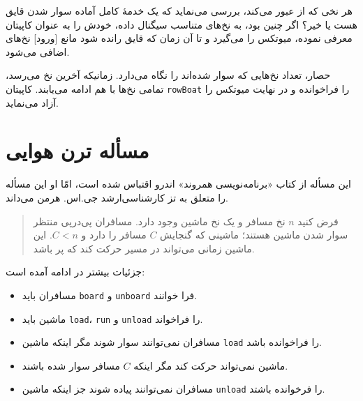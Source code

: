 \documentclass{book}
\newcommand{\clearemptydoublepage}{\newpage\cleardoublepage}
\begin{document}
    هر نخی که از  عبور می‌کند،‌ 
    بررسی می‌نماید که یک خدمهٔ کامل آماده سوار شدن قایق هست یا خیر؟ اگر چنین بود، به نخ‌های متناسب سیگنال داده، خودش را به عنوان کاپیتان 
    معرفی نموده، میوتکس را می‌گیرد و تا آن زمان که قایق رانده شود مانع [ورود] نخ‌های اضافی می‌شود. 

    حصار، تعداد نخ‌هایی که سوار شده‌اند را نگاه می‌دارد. زمانیکه آخرین نخ می‌رسد، تمامی نخ‌ها با هم ادامه می‌یابند. 
    کاپیتان  {\tt rowBoat} را فراخوانده و در نهایت میوتکس را آزاد می‌نماید. 
    


\clearemptydoublepage
\section{مسأله ترن هوایی}

    این مسأله از کتاب «برنامه‌نویسی همروند» اندرو اقتباس شده است، 
    امّا او این مسأله را متعلق به تز کارشناسی‌ارشد جی.‌اس. هرمن می‌داند. 

\begin {quotation}
    فرض کنید $n$ نخ مسافر و یک نخ ماشین وجود دارد. مسافران پی‌درپی منتظر سوار شدن ماشین هستند؛ ماشینی که گنجایش $C$  مسافر را دارد و $C<n$. 
    این ماشین زمانی می‌تواند در مسیر حرکت کند که پر باشد. 
\end{quotation}

    جزئیات بیشتر در ادامه آمده است:

\begin{itemize}

\item 
    مسافران باید {\tt board} و {\tt unboard} فرا خوانند. 

\item 
    ماشین باید {\tt load}، {\tt run} و {\tt unload} را فراخواند. 

\item 
    مسافران نمی‌توانند سوار شوند مگر اینکه ماشین {\tt load} را فراخوانده باشد. 

\item 
    ماشین نمی‌تواند حرکت کند مگر اینکه $C$ مسافر سوار شده باشند. 

\item 
    مسافران نمی‌توانند پیاده شوند جز اینکه ماشین {\tt unload} را فرخوانده باشتد. 

\end{itemize}
\end{document}

